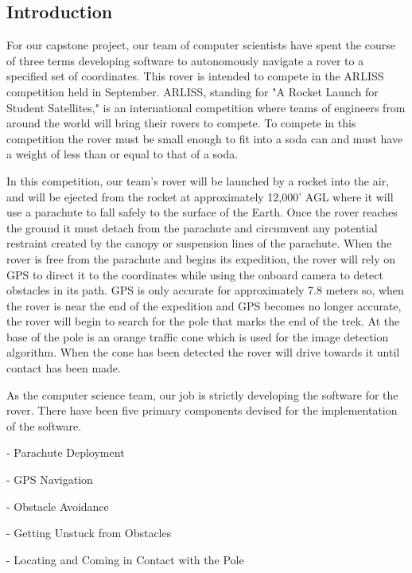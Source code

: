 \documentclass[10pt,letterpaper,onecolumn,draftclsnofoot,journal]{IEEEtran}
\begin{document}
\subsection{\textbf{Introduction}}
For our capstone project, our team of computer scientists have spent the course of three terms developing software to autonomously navigate a rover to a specified set of coordinates. This rover is intended to compete in the ARLISS competition held in September. ARLISS, standing for "A Rocket Launch for Student Satellites," is an international competition where teams of engineers from around the world will bring their rovers to compete. To compete in this competition the rover must be small enough to fit into a soda can and must have a weight of less than or equal to that of a soda.\vspace{.3cm}
\par
In this competition, our team's rover will be launched by a rocket into the air, and will be ejected from the rocket at approximately 12,000' AGL where it will use a parachute to fall safely to the surface of the Earth. Once the rover reaches the ground it must detach from the parachute and circumvent any potential restraint created by the canopy or suspension lines of the parachute. When the rover is free from the parachute and begins its expedition, the rover will rely on GPS to direct it to the coordinates while using the onboard camera to detect obstacles in its path. GPS is only accurate for approximately 7.8 meters so, when the rover is near the end of the expedition and GPS becomes no longer accurate, the rover will begin to search for the pole that marks the end of the trek. At the base of the pole is an orange traffic cone which is used for the image detection algorithm. When the cone has been detected the rover will drive towards it until contact has been made.\vspace{.3cm}
\par
As the computer science team, our job is strictly developing the software for the rover. There have been five primary components devised for the implementation of the software.\vspace{.3cm}
\par 
\hspace{.5cm} -\hspace{.3cm} Parachute Deployment\par
\hspace{.5cm} -\hspace{.3cm} GPS Navigation\par
\hspace{.5cm} -\hspace{.3cm} Obstacle Avoidance\par
\hspace{.5cm} -\hspace{.3cm} Getting Unstuck from Obstacles\par
\hspace{.5cm} -\hspace{.3cm} Locating and Coming in Contact with the Pole\vspace{.3cm}
\par 
\end{document}
